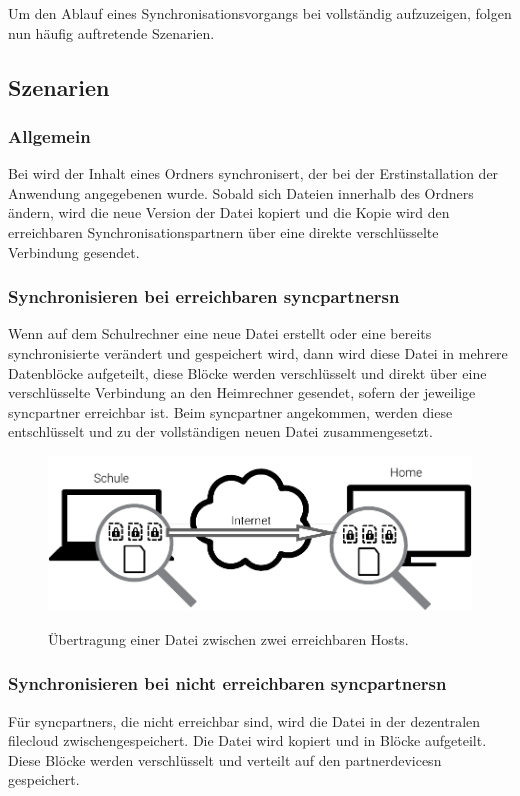 Um den Ablauf eines Synchronisationsvorgangs bei \sblit vollständig aufzuzeigen,
folgen nun häufig auftretende Szenarien.

\subsection{Szenarien}
\subsubsection{Allgemein}
Bei \sblit wird der Inhalt eines Ordners synchronisert, der bei der
Erstinstallation der Anwendung angegebenen wurde. Sobald sich Dateien innerhalb des Ordners
ändern, wird die neue Version der Datei kopiert und die Kopie wird den
erreichbaren Synchronisationspartnern über eine direkte verschlüsselte Verbindung
gesendet.

\subsubsection{Synchronisieren bei erreichbaren \glspl{syncpartner}n}
Wenn auf dem Schulrechner eine neue Datei erstellt oder eine bereits synchronisierte verändert und
gespeichert wird, dann wird diese Datei in mehrere Datenblöcke
aufgeteilt, diese Blöcke werden verschlüsselt und direkt über eine verschlüsselte
Verbindung an den Heimrechner gesendet, sofern der jeweilige \gls{syncpartner}
erreichbar ist. Beim \gls{syncpartner} angekommen, werden diese
entschlüsselt und zu der vollständigen neuen Datei zusammengesetzt.

\begin{figure}[htb]
	\centering
  \includegraphics[]{images/sblit_p2p}
	\label{sblit_p2p}
  \caption{Übertragung einer Datei zwischen zwei erreichbaren Hosts.}
\end{figure}

\subsubsection{Synchronisieren bei nicht erreichbaren \glspl{syncpartner}n}
Für \glspl{syncpartner}, die nicht erreichbar sind, wird die Datei in der dezentralen
\gls{filecloud} zwischengespeichert. Die Datei wird kopiert und in Blöcke
aufgeteilt. Diese Blöcke werden verschlüsselt und verteilt auf den
\glspl{partnerdevice}n gespeichert.

